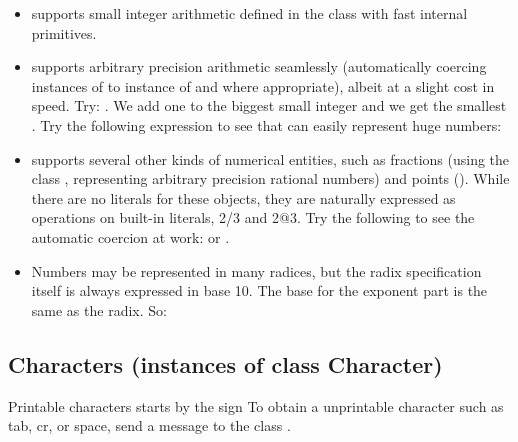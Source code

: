 \documentclass[a4paper,10pt,twoside]{book}
\begin{document}
\begin{itemize}
\item \sq supports small integer arithmetic defined in the class  with fast internal primitives.

\item \sq supports arbitrary precision arithmetic seamlessly (automatically coercing instances of  to instance of  and  where appropriate), albeit at a slight cost in speed. Try: . We add one to the biggest small integer and we get the smallest . Try the following expression to see that \sq can easily represent huge numbers: 

\item \sq supports several other kinds of numerical entities, such as fractions (using the class , representing arbitrary precision rational numbers) and points (). While there are no literals for these objects, they are naturally expressed as operations on built-in literals, \eg{} 2/3 and 2@3. Try the following to see the automatic coercion at work:   or . 

\item Numbers may be represented in many radices, but the radix specification itself is always expressed in base 10. 
The base for the exponent part is the same as the radix. So: 

\end{itemize}




\subsection{Characters (instances of class Character)}
Printable characters starts by the sign %
To obtain a unprintable character
such as tab, cr, or space, send a message to the class .
\end{document}
